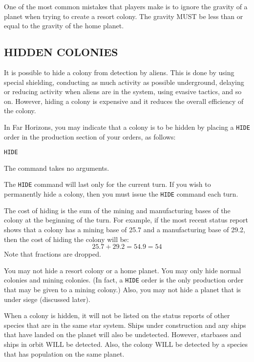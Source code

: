 \documentclass[10pt,titlepage]{article}
\begin{document}
\begin{importantnote}
	One of the most common mistakes that players make is to
	ignore the gravity of a planet when trying to create a
	resort colony.  The gravity MUST be less than or equal
	to the gravity of the home planet.
\end{importantnote}

\subsection{HIDDEN COLONIES}
\label{sec:hiddencolonies}


It is possible to hide a colony from detection by aliens.  This is done by
using special shielding, conducting as much activity as possible underground,
delaying or reducing activity when aliens are in the system, using evasive
tactics, and so on.  However, hiding a colony is expensive and it reduces the
overall efficiency of the colony.

In Far Horizons, you may indicate that a colony is to be hidden by placing a
\texttt{HIDE} order in the production section of your orders, as follows:

\begin{verbatim}
HIDE	\end{verbatim} 

The command takes no arguments.

The \texttt{HIDE} command will last only for the current turn.  If you wish to
permanently hide a colony, then you must issue the \texttt{HIDE} command each turn.

The cost of hiding is the sum of the mining and manufacturing bases of the
colony at the beginning of the turn.  For example, if the most recent status
report shows that a colony has a mining base of 25.7 and a manufacturing base
of 29.2, then the cost of hiding the colony will be:
\[
		25.7 + 29.2  =  54.9  =  54
\]
Note that fractions are dropped.

You may not hide a resort colony or a home planet.  You may only hide normal
colonies and mining colonies.  (In fact, a \texttt{HIDE} order is the only production
order that may be given to a mining colony.)  Also, you may not hide a planet
that is under siege (discussed later).

When a colony is hidden, it will not be listed on the status reports of other
species that are in the same star system.  Ships under construction and any
ships that have landed on the planet will also be undetected.  However,
starbases and ships in orbit WILL be detected.  Also, the colony WILL be
detected by a species that has population on the same planet.
\end{document}
